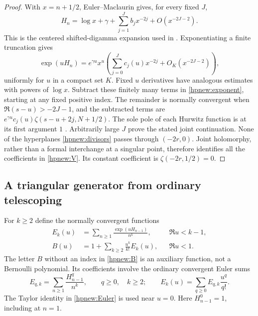 \documentclass[11pt,a4paper]{article}
\numberwithin{equation}{section}
\theoremstyle{definition}
\theoremstyle{remark}
\begin{document}
\begin{proof}
With $x=n+1/2$, Euler--Maclaurin gives, for every fixed $J$,
\[
 H_n=\log x+\gamma+\sum_{j=1}^Jb_jx^{-2j}
                              +O(x^{-2J-2}).
\]
This is the centered shifted-digamma expansion used in
\cite{RepoExactResonant}. Exponentiating a finite truncation gives
\begin{equation}\label{hpnew:asymptotic}
 \exp(uH_n)=e^{\gamma u}x^u
      \left(\sum_{j=0}^Jc_j(u)x^{-2j}
                         +O_K(x^{-2J-2})\right),
\end{equation}
uniformly for $u$ in a compact set $K$. Fixed $u$ derivatives have
analogous estimates with powers of $\log x$.
Subtract these finitely many terms in \eqref{hpnew:exponent}, starting
at any fixed positive index. The remainder is normally convergent
when $\Re(s-u)>-2J-1$, and the subtracted terms are
$e^{\gamma u}c_j(u)\zeta(s-u+2j,N+1/2)$.
The sole pole of each Hurwitz function is at its first argument $1$
\cite{DLMFHurwitz}. Arbitrarily large $J$ prove the stated joint
continuation. None of the hyperplanes \eqref{hpnew:divisors} passes
through $(-2r,0)$. Joint holomorphy, rather than a formal interchange
at a singular point, therefore identifies all the coefficients in
\eqref{hpnew:V}. Its constant coefficient is
$\zeta(-2r,1/2)=0$.
\end{proof}

\subsection{A triangular generator from ordinary telescoping}

For $k\ge2$ define the normally convergent functions
\begin{align}
 E_k(u)&=\sum_{n\ge1}\frac{\exp(uH_{n-1})}{n^k},
                                  &&\Re u<k-1,\label{hpnew:Ek}\\
 B(u)&=1+\sum_{k\ge2}\frac{u^k}{k!}E_k(u),
                                  &&\Re u<1.\label{hpnew:B}
\end{align}
The letter $B$ without an index in \eqref{hpnew:B} is an auxiliary
function, not a Bernoulli polynomial. Its coefficients involve the
ordinary convergent Euler sums
\begin{equation}\label{hpnew:Euler}
 E_{q,k}=\sum_{n\ge1}\frac{H_{n-1}^q}{n^k},\qquad
 q\ge0,\quad k\ge2;\qquad
 E_k(u)=\sum_{q\ge0}E_{q,k}\frac{u^q}{q!}.
\end{equation}
The Taylor identity in \eqref{hpnew:Euler} is used near $u=0$.
Here $H_{n-1}^0=1$, including at $n=1$.
\end{document}
